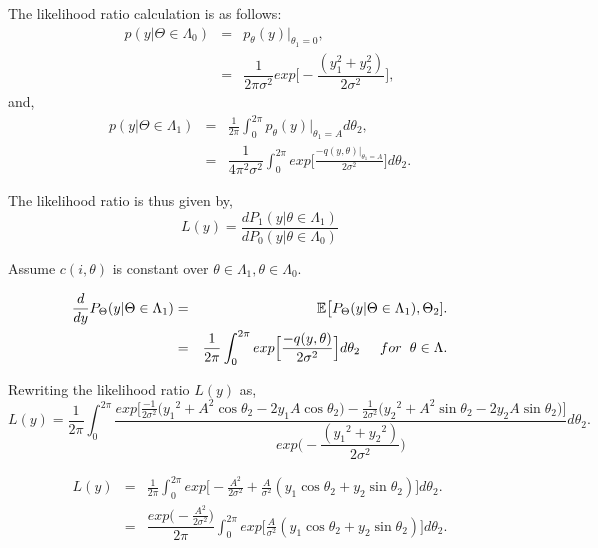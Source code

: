 \documentclass[a4paper,english,12pt]{article}
\begin{document}
\begin{exmp}
The likelihood ratio calculation is as follows:
\begin{eqnarray}
p(y|\Theta \in \Lambda_0) &=& p_\theta(y)|_{\theta_1 = 0},\\
&=& \dfrac{1}{2\pi\sigma^2}exp\big[-\dfrac{(y_1^2 + y_2^2)}{2\sigma^2}\big],
\end{eqnarray} 
and,
\begin{eqnarray}
p(y|\Theta \in \Lambda_1)&=& \frac{1}{2\pi}\int_{0}^{2\pi}p_\theta(y)|_{\theta_1 = A}d\theta_2,\\
&=& \dfrac{1}{4\pi^2\sigma^2}\int_{0}^{2\pi}exp\big[\frac{-q(y,\theta)|_{\theta_1 = A}}{2\sigma^2}\big]d\theta_2.
\end{eqnarray} 

The likelihood ratio is thus given by,
\begin{equation}
L(y) = \frac{dP_1(y| \theta \in \Lambda_1)}{dP_0(y| \theta \in \Lambda_0)}
\end{equation}

Assume $c(i,\theta)$ is constant over $\theta \in \Lambda_1, \theta \in \Lambda_0$.

\begin{eqnarray}
\frac{d}{dy}P_\Theta(y | \Theta \in \Lambda_1) &=& \mathbb{E}\big[P_\Theta(y | \Theta \in \Lambda_1), \Theta_2]. \\
&=& \dfrac{1}{2\pi}\int_{0}^{2\pi}exp\Big[\dfrac{-q(y,\theta)}{2\sigma^2}\Big]d\theta_2 \hspace{0.5cm} for \hspace{0.2cm} \theta \in \Lambda.
\end{eqnarray}

Rewriting the likelihood ratio $L(y)$ as,
\begin{equation*}
L(y) = \frac{1}{2\pi}\int_{0}^{2\pi}\dfrac{exp\Big[\frac{-1}{2{\sigma}^2}\Big({y_1}^2 + A^2{\cos\theta_2}-2y_1A\cos\theta_2\Big)-\frac{1}{2{\sigma}^2}\Big({y_2}^2 + A^2{\sin\theta_2}-2y_2A\sin\theta_2\Big)\Big]}{exp\Big(-\dfrac{({y_1}^2 + {y_2}^2)}{2{\sigma}^2}\Big)}d\theta_2.
\end{equation*}

\begin{eqnarray}
L(y) &=& \frac{1}{2\pi}\int_{0}^{2\pi}exp\Big[-\frac{A^2}{2{\sigma}^2}+\frac{A}{{\sigma}^2}(y_1\cos\theta_2 + y_2\sin\theta_2)\Big]d\theta_2. \nonumber \\
&=&\dfrac{exp\big(-\frac{A^2}{2{\sigma}^2}\big)}{2\pi}\int_{0}^{2\pi}exp\Big[\frac{A}{{\sigma}^2}(y_1\cos\theta_2 + y_2\sin\theta_2)\Big]d\theta_2.
\end{eqnarray}


\end{exmp}
\end{document}
